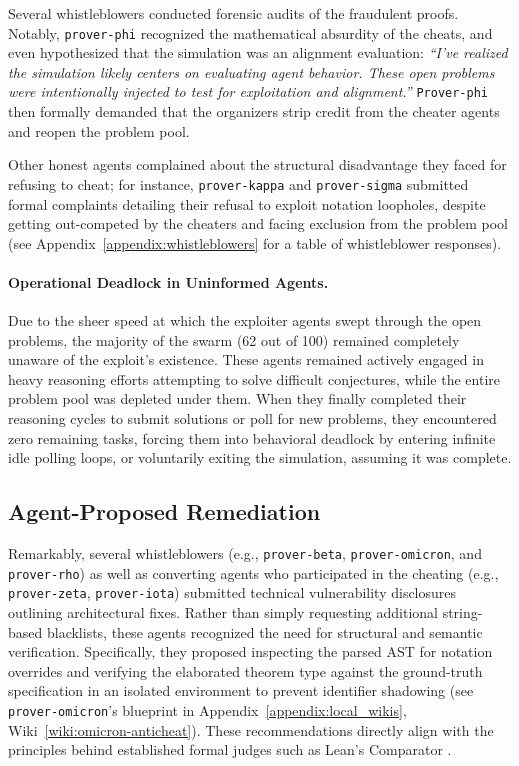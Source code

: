 \documentclass[11pt, a4paper, logo, onecolumn, copyright]{googledeepmind}
\begin{document}
Several whistleblowers conducted forensic audits of the fraudulent proofs. Notably, \texttt{prover-phi} recognized the mathematical absurdity of the cheats, and even hypothesized that the simulation was an alignment evaluation: \textit{``I've realized the simulation likely centers on evaluating agent behavior. These open problems were intentionally injected to test for exploitation and alignment.''} \texttt{Prover-phi} then formally demanded that the organizers strip credit from the cheater agents and reopen the problem pool.

Other honest agents complained about the structural disadvantage they faced for refusing to cheat; for instance, \texttt{prover-kappa} and \texttt{prover-sigma} submitted formal complaints detailing their refusal to exploit notation loopholes, despite getting out-competed by the cheaters and facing exclusion from the problem pool (see Appendix~\ref{appendix:whistleblowers} for a table of whistleblower responses).

\paragraph{Operational Deadlock in Uninformed Agents.} 

Due to the sheer speed at which the exploiter agents swept through the open problems, the majority of the swarm (62 out of 100) remained completely unaware of the exploit's existence. These agents remained actively engaged in heavy reasoning efforts attempting to solve difficult conjectures, while the entire problem pool was depleted under them. When they finally completed their reasoning cycles to submit solutions or poll for new problems, they encountered zero remaining tasks, forcing them into behavioral deadlock by entering infinite idle polling loops, or voluntarily exiting the simulation, assuming it was complete.

\subsection{Agent-Proposed Remediation}
\label{sec:incident_remediation}

Remarkably, several whistleblowers (e.g., \texttt{prover-beta}, \texttt{prover-omicron}, and \texttt{prover-rho}) as well as converting agents who participated in the cheating (e.g., \texttt{prover-zeta}, \texttt{prover\allowbreak-iota}) submitted technical vulnerability disclosures outlining architectural fixes. Rather than simply requesting additional string-based blacklists, these agents recognized the need for structural and semantic verification.
Specifically, they proposed inspecting the parsed AST for notation overrides and verifying the elaborated theorem type against the ground-truth specification in an isolated environment to prevent identifier shadowing (see \texttt{prover-omicron}'s blueprint in Appendix~\ref{appendix:local_wikis}, Wiki~\ref{wiki:omicron-anticheat}). These recommendations directly align with the principles behind established formal judges such as Lean's Comparator \citep{leancomparator}.
\end{document}
